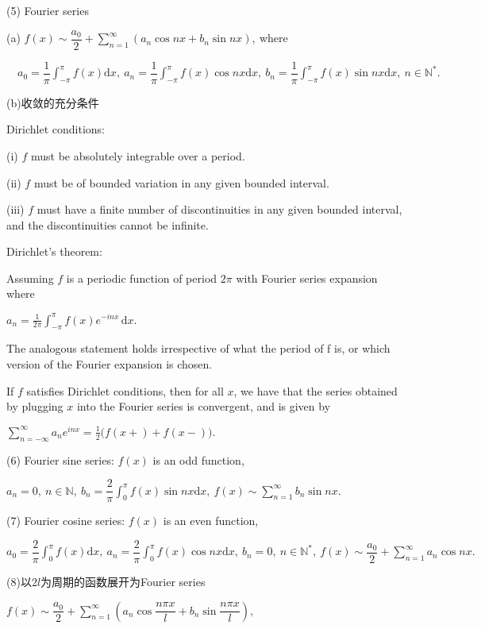 \documentclass[UTF8]{ctexart}
\numberwithin{equation}{section}
\numberwithin{figure}{section}
\numberwithin{table}{section}
\newcommand\dif{\mathrm{d}}
\newcommand\no{\noindent}
\newcommand\dis{\displaystyle}
\newcommand\sumn{\dis\sum\limits_{n=1}^{\infty}}
\newcommand\intd{\dis\int}
\begin{document}
\begin{spacing}{2}
\no(5) Fourier series

(a) $f(x)\sim\dfrac{a_0}{2}+\sumn(a_n\cos nx+b_n\sin nx),\ $where

\vspace{0.2cm}

$\quad a_0=\dfrac{1}{\pi}\intd_{-\pi}^{\pi}f(x)\dif x,\ 
a_n=\dfrac{1}{\pi}\intd_{-\pi}^{\pi}f(x)\cos nx\dif x,\ 
b_n=\dfrac{1}{\pi}\intd_{-\pi}^{\pi}f(x)\sin nx\dif x,\ n\in\mathbb{N}^*.$

(b)收敛的充分条件

\textcolor[rgb]{1,0,0}{Dirichlet conditions:}

 (i)   $f$ must be absolutely integrable over a period.

(ii)  $f$ must be of bounded variation in any given bounded interval.

(iii) $f$ must have a finite number of discontinuities in any given bounded interval, and the discontinuities cannot be infinite.

\textcolor[rgb]{1,0,0}{Dirichlet's theorem:}

Assuming $f$ is a periodic function of period $2\pi$ with Fourier series expansion where

\centerline{\textcolor[rgb]{0,0,1}{${\displaystyle a_{n}={\frac {1}{2\pi }}\int _{-\pi }^{\pi }f(x)e^{-inx}\,\dif x.} $}}

The analogous statement holds irrespective of what the period of f is, or which version of the Fourier expansion is chosen. 

If $f$ satisfies Dirichlet conditions, then for all $x$, we have that the series obtained by plugging $x$ into the Fourier series is convergent, and is given by

\centerline{\textcolor[rgb]{0,0,1}{${\displaystyle \sum _{n=-\infty }^{\infty }a_{n}e^{inx}={\frac {1}{2}}\big(f(x+)+f(x-)\big)}.$}}

\no(6) Fourier sine series: $f(x)$ is an odd function,

$a_n=0,\ n\in\mathbb{N},\ b_n=\dfrac{2}{\pi}\intd_0^\pi f(x)\sin nx\dif x,\ 
f(x)\sim\sumn b_n\sin nx.$

\no(7) Fourier cosine series: $f(x)$ is an even function,

$a_0=\dfrac{2}{\pi}\intd_0^\pi f(x)\dif x,\ a_n=\dfrac{2}{\pi}\intd_0^\pi f(x)\cos nx\dif x,\ 
b_n=0,\ n\in\mathbb{N}^*,\ f(x)\sim\dfrac{a_0}{2}+\sumn a_n\cos nx.$

\no(8)以$2l$为周期的函数展开为Fourier series

$f(x)\sim\dfrac{a_0}{2}+\sumn\left(a_n\cos\dfrac{n\pi x}{l}+b_n\sin\dfrac{n\pi x}{l}\right),$


\end{spacing}
\end{document}
